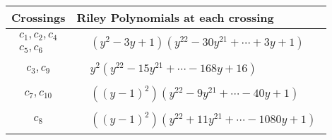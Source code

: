 \documentclass[1p]{elsarticle_modified}
\theoremstyle{definition}
\begin{document}
\begin{tabular}{m{50pt}|m{274pt}}
Crossings & \hspace{64pt}Riley Polynomials at each crossing \\
\hline $$\begin{aligned}c_{1},c_{2},c_{4}\\c_{5},c_{6}\end{aligned}$$&$\begin{aligned}
&(y^2-3 y+1)(y^{22}-30 y^{21}+\cdots+3 y+1)
\end{aligned}$\\
\hline $$\begin{aligned}c_{3},c_{9}\end{aligned}$$&$\begin{aligned}
&y^2(y^{22}-15 y^{21}+\cdots-168 y+16)
\end{aligned}$\\
\hline $$\begin{aligned}c_{7},c_{10}\end{aligned}$$&$\begin{aligned}
&((y-1)^2)(y^{22}-9 y^{21}+\cdots-40 y+1)
\end{aligned}$\\
\hline $$\begin{aligned}c_{8}\end{aligned}$$&$\begin{aligned}
&((y-1)^2)(y^{22}+11 y^{21}+\cdots-1080 y+1)
\end{aligned}$\\
\hline
\end{tabular}
\vskip 2pc
\end{document}
